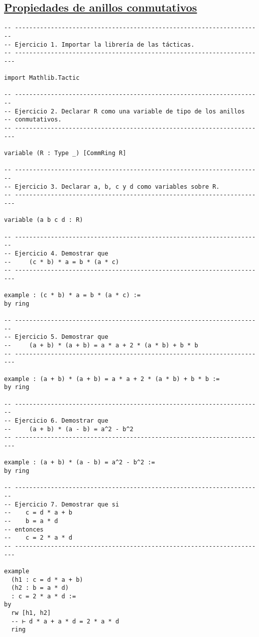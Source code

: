 \subsection{\href{./src/Basicos/Propiedades\_de\_anillos\_conmutativos.lean}{Propiedades de anillos conmutativos}}
\label{sec:orgba03366}
\begin{verbatim}
-- ---------------------------------------------------------------------
-- Ejercicio 1. Importar la librería de las tácticas.
-- ----------------------------------------------------------------------

import Mathlib.Tactic

-- ---------------------------------------------------------------------
-- Ejercicio 2. Declarar R como una variable de tipo de los anillos
-- conmutativos.
-- ----------------------------------------------------------------------

variable (R : Type _) [CommRing R]

-- ---------------------------------------------------------------------
-- Ejercicio 3. Declarar a, b, c y d como variables sobre R.
-- ----------------------------------------------------------------------

variable (a b c d : R)

-- ---------------------------------------------------------------------
-- Ejercicio 4. Demostrar que
--     (c * b) * a = b * (a * c)
-- ----------------------------------------------------------------------

example : (c * b) * a = b * (a * c) :=
by ring

-- ---------------------------------------------------------------------
-- Ejercicio 5. Demostrar que
--     (a + b) * (a + b) = a * a + 2 * (a * b) + b * b
-- ----------------------------------------------------------------------

example : (a + b) * (a + b) = a * a + 2 * (a * b) + b * b :=
by ring

-- ---------------------------------------------------------------------
-- Ejercicio 6. Demostrar que
--     (a + b) * (a - b) = a^2 - b^2
-- ----------------------------------------------------------------------

example : (a + b) * (a - b) = a^2 - b^2 :=
by ring

-- ---------------------------------------------------------------------
-- Ejercicio 7. Demostrar que si
--    c = d * a + b
--    b = a * d
-- entonces
--    c = 2 * a * d
-- ----------------------------------------------------------------------

example
  (h1 : c = d * a + b)
  (h2 : b = a * d)
  : c = 2 * a * d :=
by
  rw [h1, h2]
  -- ⊢ d * a + a * d = 2 * a * d
  ring
\end{verbatim}

